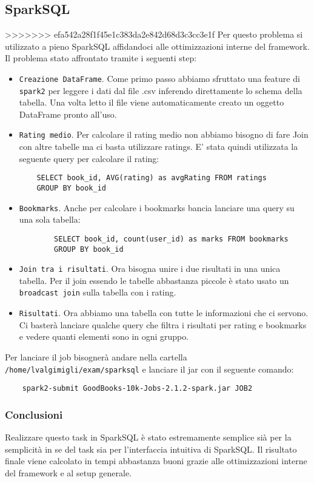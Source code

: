 \subsection{SparkSQL}
>>>>>>> efa542a28f1f45e1c383da2e842d68d3c3cc3e1f
Per questo problema si \è utilizzato a pieno SparkSQL affidandoci alle ottimizzazioni interne del framework. Il problema
\è stato affrontato tramite i seguenti step:
\begin{itemize}
    \item \texttt{Creazione DataFrame}. Come primo passo abbiamo sfruttato una feature di \texttt{spark2} per leggere
    i dati dal file .csv inferendo direttamente lo schema della tabella. Una volta letto il file viene automaticamente creato
    un oggetto DataFrame pronto all'uso.
    \item \texttt{Rating medio}. Per calcolare il rating medio non abbiamo bisogno di fare Join con altre tabelle ma ci basta utilizzare
    ratings. E' stata quindi utilizzata la seguente query per calcolare il rating:
    \begin{verbatim}
    SELECT book_id, AVG(rating) as avgRating FROM ratings
    GROUP BY book_id
    \end{verbatim}
    \item \texttt{Bookmarks}. Anche per calcolare i bookmarks bancia lanciare una query su una sola tabella:
    \begin{verbatim}
        SELECT book_id, count(user_id) as marks FROM bookmarks
        GROUP BY book_id
    \end{verbatim}
    \item \texttt{Join tra i risultati}. Ora bisogna unire i due risultati in una unica tabella. Per il join essendo le
    tabelle abbastanza piccole è stato usato un \texttt{broadcast join} sulla tabella con i rating.
    \item \texttt{Risultati}. Ora abbiamo una tabella con tutte le informazioni che ci servono.
    Ci basterà lanciare qualche query che filtra i risultati per rating e bookmarks e vedere quanti elementi sono in
    ogni gruppo.
\end{itemize}

Per lanciare il job bisognerà andare nella cartella \texttt{/home/lvalgimigli/exam/sparksql} e lanciare il jar con il seguente comando:
\begin{verbatim}
    spark2-submit GoodBooks-10k-Jobs-2.1.2-spark.jar JOB2
\end{verbatim}

\subsubsection{Conclusioni}

Realizzare questo task in SparkSQL è stato estremamente semplice sià per la semplicità in se del task sia per l'interfaccia
intuitiva di SparkSQL. Il risultato finale viene calcolato in tempi abbastanza buoni grazie alle ottimizzazioni interne del framework e
al setup generale.

